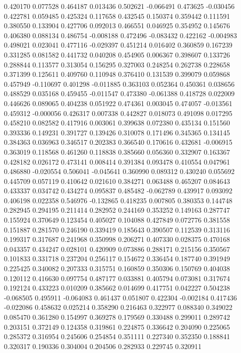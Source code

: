 0.420170
0.077528
0.464187
0.013436
0.502621
-0.066491
0.473625
-0.030456
0.422781
0.059485
0.425324
0.117658
0.432545
0.150374
0.359442
0.111591
0.380550
0.133904
0.427706
0.092013
0.466551
0.046925
0.354952
0.145676
0.406380
0.088134
0.486754
-0.008188
0.472496
-0.083432
0.422162
-0.004983
0.498021
0.023041
0.477116
-0.029397
0.451214
0.016402
0.360859
0.167239
0.331285
0.081582
0.441732
0.040208
0.454905
0.006367
0.398607
0.133726
0.288844
0.113577
0.313054
0.156295
0.327003
0.248254
0.262738
0.228658
0.371399
0.125611
0.409760
0.110948
0.376410
0.131539
0.399079
0.059868
0.457949
-0.110697
0.401298
-0.011885
0.363103
0.052364
0.450361
0.038656
0.488529
0.035168
0.459455
-0.011547
0.473380
-0.061388
0.418728
0.022009
0.446626
0.089065
0.404238
0.051922
0.474361
0.003045
0.474057
-0.013561
0.459312
-0.000056
0.426317
0.007338
0.442827
0.018073
0.491098
0.017295
0.458210
0.082582
0.417916
0.003061
0.399638
0.072380
0.435134
0.151560
0.393336
0.149231
0.391727
0.139426
0.310078
0.171496
0.345365
0.134145
0.384363
0.036963
0.346517
0.202383
0.366540
0.170616
0.432681
-0.006915
0.363019
0.118568
0.461260
0.118838
0.385660
0.056360
0.332907
0.163367
0.428182
0.026172
0.473141
0.008414
0.391384
0.093478
0.410554
0.047961
0.486880
-0.020554
0.506041
-0.045641
0.360990
0.089312
0.430240
0.055692
0.445709
0.057119
0.410642
0.021610
0.384271
0.063488
0.465207
0.084643
0.433337
0.034742
0.434274
0.095837
0.485482
-0.062789
0.439917
0.093092
0.406198
0.022358
0.546976
-0.132865
0.418235
0.007805
0.380353
0.144748
0.282945
0.294195
0.211414
0.282952
0.244169
0.353252
0.149163
0.287747
0.155924
0.370649
0.123454
0.405027
0.104088
0.427849
0.072776
0.381558
0.151887
0.281570
0.246190
0.339419
0.185643
0.390507
0.112539
0.313116
0.199317
0.317687
0.241968
0.350998
0.206271
0.407330
0.028375
0.470168
0.043357
0.434247
0.028101
0.420909
0.073886
0.288171
0.215156
0.350567
0.101833
0.331718
0.237204
0.256117
0.154672
0.336454
0.187740
0.391949
0.225425
0.340082
0.207333
0.315751
0.160859
0.350306
0.150769
0.404038
0.120112
0.416630
0.097754
0.487177
0.033881
0.405794
0.073081
0.317674
0.192124
0.433223
0.010209
0.385662
0.014699
0.417751
0.042227
0.504238
-0.068505
0.495911
-0.064083
0.461437
0.051807
0.422304
-0.002184
0.417436
-0.022086
0.458632
0.025214
0.358290
0.216463
0.322977
0.088340
0.349022
0.085470
0.361280
0.154997
0.369278
0.179569
0.330488
0.299011
0.289742
0.203151
0.372149
0.124358
0.319861
0.224875
0.336642
0.204090
0.225065
0.285372
0.316954
0.245606
0.254854
0.351111
0.227340
0.352350
0.188841
0.320317
0.190336
0.304004
0.204506
0.282933
0.229745
0.320911
